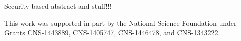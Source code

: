 \documentclass[12pt]{report}
\begin{document}
Security-based abstract and stuff!!!

\vfill

This work was supported in part by the National Science Foundation under Grants 
CNS-1443889, CNS-1405747, CNS-1446478, and CNS-1343222.

\pagebreak


\tableofcontents
\pagebreak

\listoffigures
\pagebreak

\listoftables
\pagebreak

\pagestyle{myheadings}

\end{document}
